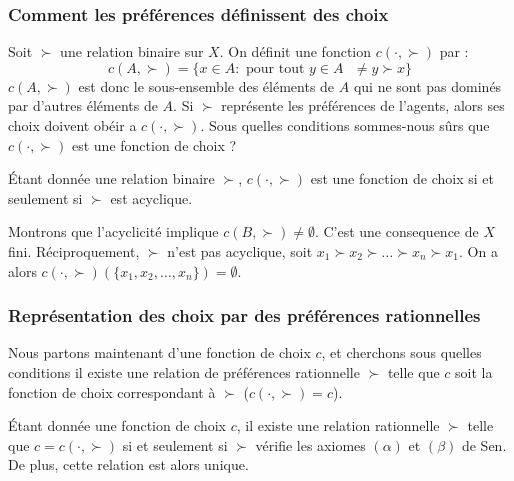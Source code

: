 \subsubsection{Comment les préférences définissent des choix}
Soit $\succ$ une relation binaire sur $X$. On définit une fonction
$c(\cdot,\succ)$ par :
$$
c(A,\succ) = \{x\in A \colon \mbox{ pour tout $y\in A$ } \neq y \succ x\}
$$
$c(A,\succ)$ est donc le sous-ensemble des éléments de $A$ qui ne
sont pas dominés par d'autres éléments de $A$. Si $\succ$
représente les préférences de l'agents, alors ses choix doivent
obéir a $c(\cdot,\succ)$. Sous quelles conditions sommes-nous
s\^urs que $c(\cdot,\succ)$ est une fonction de choix ?

\begin{proposition}
Étant donnée une relation binaire $\succ$, $c(\cdot,\succ)$ est
une fonction de choix si et seulement si $\succ$ est acyclique.
\end{proposition}

Montrons que l'acyclicité implique $c(B,\succ)\neq\emptyset$.
C'est une consequence de $X$ fini. Réciproquement, $\succ$ n'est
pas acyclique, soit $x_1\succ x_2\succ\ldots\succ x_n\succ x_1$.
On a alors $c(\cdot, \succ)(\{x_1,x_2,\ldots, x_n\})=\emptyset$.

\subsubsection{Représentation des choix par des préférences rationnelles}
Nous partons maintenant d'une fonction de choix $c$, et cherchons
sous quelles conditions il existe une relation de préférences
rationnelle $\succ$ telle que $c$ soit la fonction de choix
correspondant à $\succ$ ($c(\cdot,\succ)=c$).

\begin{proposition}
Étant donnée une fonction de choix $c$, il existe une relation
rationnelle $\succ$ telle que $c=c(\cdot,\succ)$ si et seulement
si $\succ$ vérifie les axiomes $(\alpha)$ et $(\beta)$ de Sen. De
plus, cette relation est alors unique.
\end{proposition}

